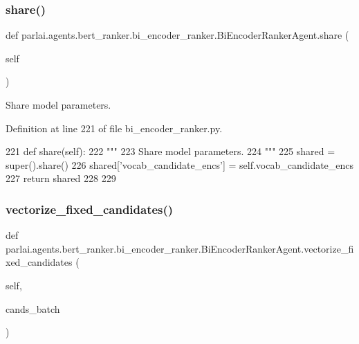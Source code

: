 \subsubsection{\texorpdfstring{share()}{share()}}
{\footnotesize\ttfamily def parlai.\+agents.\+bert\+\_\+ranker.\+bi\+\_\+encoder\+\_\+ranker.\+Bi\+Encoder\+Ranker\+Agent.\+share (\begin{DoxyParamCaption}\item[{}]{self }\end{DoxyParamCaption})}

\begin{DoxyVerb}Share model parameters.
\end{DoxyVerb}
 

Definition at line 221 of file bi\+\_\+encoder\+\_\+ranker.\+py.


\begin{DoxyCode}
221     \textcolor{keyword}{def }share(self):
222         \textcolor{stringliteral}{"""}
223 \textcolor{stringliteral}{        Share model parameters.}
224 \textcolor{stringliteral}{        """}
225         shared = super().share()
226         shared[\textcolor{stringliteral}{'vocab\_candidate\_encs'}] = self.vocab\_candidate\_encs
227         \textcolor{keywordflow}{return} shared
228 
229 
\end{DoxyCode}
\mbox{\label{classparlai_1_1agents_1_1bert__ranker_1_1bi__encoder__ranker_1_1BiEncoderRankerAgent_a3062adbae2449553b4a6e12c5973116d}} 
\subsubsection{\texorpdfstring{vectorize\+\_\+fixed\+\_\+candidates()}{vectorize\_fixed\_candidates()}}
{\footnotesize\ttfamily def parlai.\+agents.\+bert\+\_\+ranker.\+bi\+\_\+encoder\+\_\+ranker.\+Bi\+Encoder\+Ranker\+Agent.\+vectorize\+\_\+fixed\+\_\+candidates (\begin{DoxyParamCaption}\item[{}]{self,  }\item[{}]{cands\+\_\+batch }\end{DoxyParamCaption})}

